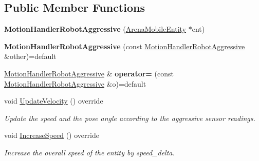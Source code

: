 \subsection*{Public Member Functions}
\begin{DoxyCompactItemize}
\item 
\mbox{\label{class_motion_handler_robot_aggressive_acf648d0f2f208acae95758437a426299}} 
{\bfseries Motion\+Handler\+Robot\+Aggressive} (\mbox{\hyperlink{class_arena_mobile_entity}{Arena\+Mobile\+Entity}} $\ast$ent)
\item 
\mbox{\label{class_motion_handler_robot_aggressive_a044bb32eea5f808939acd90964b4e1c4}} 
{\bfseries Motion\+Handler\+Robot\+Aggressive} (const \mbox{\hyperlink{class_motion_handler_robot_aggressive}{Motion\+Handler\+Robot\+Aggressive}} \&other)=default
\item 
\mbox{\label{class_motion_handler_robot_aggressive_a7fc4c7bc46c31da2cd51b3cbce16d1d9}} 
\mbox{\hyperlink{class_motion_handler_robot_aggressive}{Motion\+Handler\+Robot\+Aggressive}} \& {\bfseries operator=} (const \mbox{\hyperlink{class_motion_handler_robot_aggressive}{Motion\+Handler\+Robot\+Aggressive}} \&o)=default
\item 
\mbox{\label{class_motion_handler_robot_aggressive_ac8bee64034c5fbf46dfce6de36b61dbe}} 
void \mbox{\hyperlink{class_motion_handler_robot_aggressive_ac8bee64034c5fbf46dfce6de36b61dbe}{Update\+Velocity}} () override
\begin{DoxyCompactList}\small\item\em Update the speed and the pose angle according to the aggressive sensor readings. \end{DoxyCompactList}\item 
\mbox{\label{class_motion_handler_robot_aggressive_afb955c958c2b1670e023cf7b6587cce6}} 
void \mbox{\hyperlink{class_motion_handler_robot_aggressive_afb955c958c2b1670e023cf7b6587cce6}{Increase\+Speed}} () override
\begin{DoxyCompactList}\small\item\em Increase the overall speed of the entity by speed\+\_\+delta. \end{DoxyCompactList}\item 

\end{DoxyCompactItemize}
